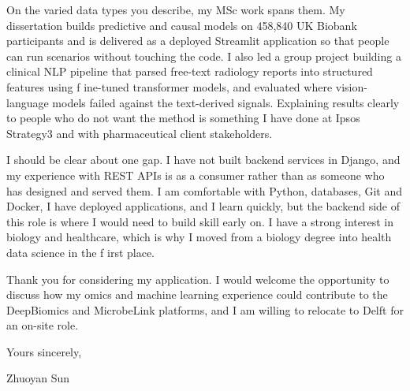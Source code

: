 \documentclass[letterpaper,11pt]{article}
\begin{document}
On the varied data types you describe, my MSc work spans them. My dissertation builds predictive and causal models on 458,840 UK Biobank participants and is delivered as a deployed Streamlit application so that people can run scenarios without touching the code. I also led a group project building a clinical NLP pipeline that parsed free-text radiology reports into structured features using f\kern0pt ine-tuned transformer models, and evaluated where vision-language models failed against the text-derived signals. Explaining results clearly to people who do not want the method is something I have done at Ipsos Strategy3 and with pharmaceutical client stakeholders.

I should be clear about one gap. I have not built backend services in Django, and my experience with REST APIs is as a consumer rather than as someone who has designed and served them. I am comfortable with Python, databases, Git and Docker, I have deployed applications, and I learn quickly, but the backend side of this role is where I would need to build skill early on. I have a strong interest in biology and healthcare, which is why I moved from a biology degree into health data science in the f\kern0pt irst place.

Thank you for considering my application. I would welcome the opportunity to discuss how my omics and machine learning experience could contribute to the DeepBiomics and MicrobeLink platforms, and I am willing to relocate to Delft for an on-site role.

\vspace{2pt}
Yours sincerely,

\vspace{8pt}
Zhuoyan Sun
\end{document}
